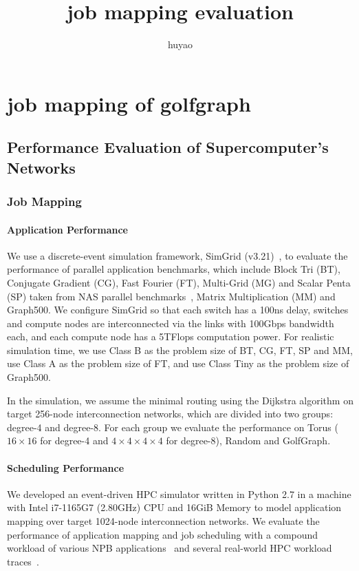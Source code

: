 \documentclass[conference]{IEEEtran}
\begin{document}
\title{job mapping evaluation}
\author{huyao}
\date{}
\maketitle
\else
\chapter{job mapping of golfgraph}
\fi
\section{Performance Evaluation of Supercomputer's Networks}
\subsection{Job Mapping}

\subsubsection{Application Performance}

We use a discrete-event simulation framework, SimGrid (v3.21)~\cite{SimGrid}, to evaluate the performance of parallel application benchmarks,  which include Block Tri (BT), Conjugate Gradient (CG), Fast Fourier (FT), Multi-Grid (MG) and Scalar Penta (SP) taken from NAS parallel benchmarks~\cite{benchmark}, Matrix Multiplication (MM) and Graph500.   
We configure SimGrid so that each switch has a 100ns delay, switches and compute nodes are interconnected via the links with 100Gbps bandwidth each, and each compute node has a 5TFlops computation power. 
For realistic simulation time, we use Class B as the problem size of BT, CG, FT, SP and MM, use Class A as the problem size of FT, and use Class Tiny as the problem size of Graph500.

In the simulation, we assume the minimal routing using the Dijkstra algorithm on target 256-node interconnection networks, which are divided into two groups: degree-4 and degree-8.
For each group we evaluate the performance on Torus ($16 \times 16$ for degree-4 and $4 \times 4 \times 4 \times 4$ for degree-8), Random and GolfGraph.

\subsubsection{Scheduling Performance}

We developed an event-driven HPC simulator written in Python 2.7 in a machine with Intel i7-1165G7 (2.80GHz) CPU and 16GiB Memory to model application mapping over target 1024-node interconnection networks. 
We evaluate the performance of application mapping and job scheduling with a compound workload of various NPB applications~\cite{NPB} and several real-world HPC workload traces~\cite{wm}.
\end{document}
